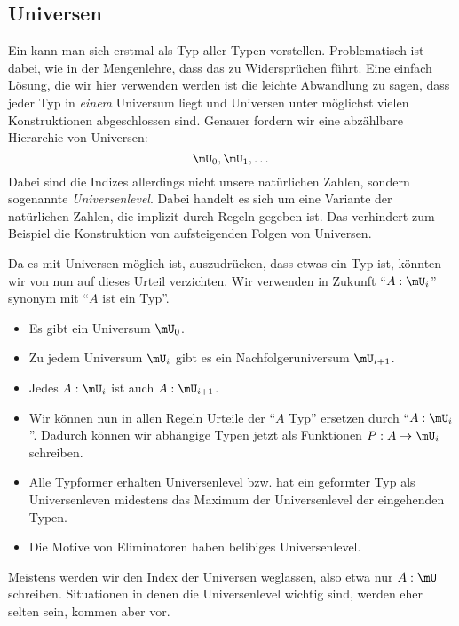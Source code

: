 \subsection{Universen}
Ein  kann man sich erstmal als Typ aller Typen vorstellen.
Problematisch ist dabei, wie in der Mengenlehre, dass das zu Widersprüchen führt.
Eine einfach Lösung, die wir hier verwenden werden ist die leichte Abwandlung zu sagen, dass jeder Typ in \emph{einem} Universum liegt und Universen unter möglichst vielen Konstruktionen abgeschlossen sind.
Genauer fordern wir eine abzählbare Hierarchie von Universen:
\[
  \mU_0, \mU_1, \dots
\]
Dabei sind die Indizes allerdings nicht unsere natürlichen Zahlen, sondern sogenannte \emph{Universenlevel}.
Dabei handelt es sich um eine Variante der natürlichen Zahlen, die implizit durch Regeln gegeben ist.
Das verhindert zum Beispiel die Konstruktion von aufsteigenden Folgen von Universen.

Da es mit Universen möglich ist, auszudrücken, dass etwas ein Typ ist, könnten wir von nun auf dieses Urteil verzichten.
Wir verwenden in Zukunft ``$A:\mU_i$'' synonym mit ``$A$ ist ein Typ''.

\begin{regeln}
\begin{itemize}
\item Es gibt ein Universum $\mU_0$.
\item Zu jedem Universum $\mU_i$ gibt es ein Nachfolgeruniversum $\mU_{i+1}$.
\item Jedes $A:\mU_i$ ist auch $A:\mU_{i+1}$.
\item Wir können nun in allen Regeln Urteile der ``$A$ Typ'' ersetzen durch ``$A:\mU_i$''.
  Dadurch können wir abhängige Typen jetzt als Funktionen $P:A\to\mU_i$ schreiben.
\item Alle Typformer erhalten Universenlevel bzw. hat ein geformter Typ als Universenleven midestens das Maximum der Universenlevel der eingehenden Typen.
\item Die Motive von Eliminatoren haben belibiges Universenlevel.
\end{itemize}
\end{regeln}

\begin{konvention}
  Meistens werden wir den Index der Universen weglassen, also etwa nur $A:\mU$ schreiben.
  Situationen in denen die Universenlevel wichtig sind, werden eher selten sein, kommen aber vor.
\end{konvention}


